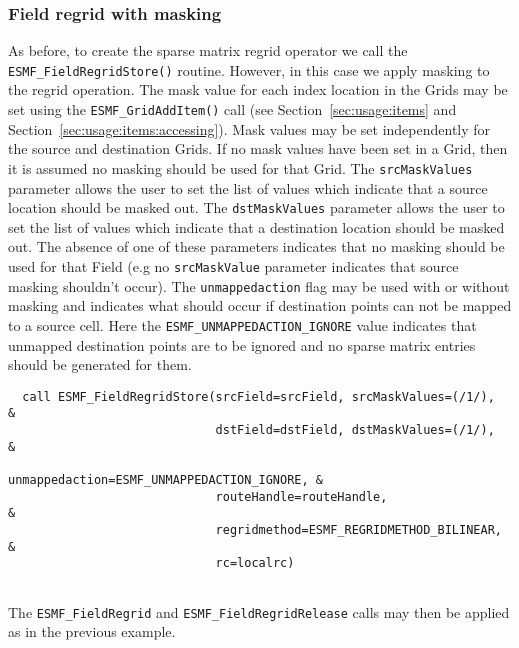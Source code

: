  \subsubsection{Field regrid with masking}
   As before, to create the sparse matrix regrid operator we call the
   {\tt ESMF\_FieldRegridStore()} routine. 
   However, in this case we apply masking to the regrid operation. 
   The mask value for each index location in the Grids may be set using
   the {\tt ESMF\_GridAddItem()} call (see Section~\ref{sec:usage:items}
   and Section~\ref{sec:usage:items:accessing}). Mask values may be set independently 
   for the source and destination Grids. If no mask values have been set in a Grid, then it is 
   assumed no masking should be used for that Grid. The {\tt srcMaskValues}
   parameter allows the user to set the list of values which indicate
   that a source location should be masked out. The {\tt dstMaskValues}
   parameter allows the user to set the list of values which indicate
   that a destination location should be masked out. The absence of 
   one of these parameters indicates that no masking should be used
   for that Field (e.g no {\tt srcMaskValue} parameter indicates that source
   masking shouldn't occur). The {\tt unmappedaction} flag may be
   used with or without masking and indicates what should occur
   if destination points can not be mapped to a source cell. 
   Here the {\tt ESMF\_UNMAPPEDACTION\_IGNORE} value indicates that unmapped
   destination points are to be ignored and no sparse matrix entries should be
    generated for them.  

 \begin{verbatim}
  call ESMF_FieldRegridStore(srcField=srcField, srcMaskValues=(/1/),       &
                             dstField=dstField, dstMaskValues=(/1/),       &
                             unmappedaction=ESMF_UNMAPPEDACTION_IGNORE, &
                             routeHandle=routeHandle,                      &
                             regridmethod=ESMF_REGRIDMETHOD_BILINEAR,     &
                             rc=localrc)
 
\end{verbatim}
 

  
   The {\tt ESMF\_FieldRegrid} and {\tt ESMF\_FieldRegridRelease} calls
   may then be applied as in the previous example.
\setlength{\parskip}{\oldparskip}
\setlength{\parindent}{\oldparindent}
\setlength{\baselineskip}{\oldbaselineskip}
